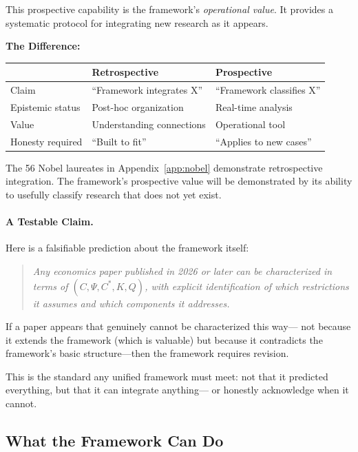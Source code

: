 This prospective capability is the framework's \emph{operational value}.
It provides a systematic protocol for integrating new research as it appears.

\textbf{The Difference:}
\begin{center}
\renewcommand{\arraystretch}{1.3}
\begin{tabular}{lll}
\hline
& \textbf{Retrospective} & \textbf{Prospective} \\
\hline
Claim & ``Framework integrates X'' & ``Framework classifies X'' \\
Epistemic status & Post-hoc organization & Real-time analysis \\
Value & Understanding connections & Operational tool \\
Honesty required & ``Built to fit'' & ``Applies to new cases'' \\
\hline
\end{tabular}
\end{center}

The 56 Nobel laureates in Appendix~\ref{app:nobel} demonstrate retrospective
integration. The framework's prospective value will be demonstrated by
its ability to usefully classify research that does not yet exist.

\paragraph{A Testable Claim.}
Here is a falsifiable prediction about the framework itself:

\begin{quote}
\emph{Any economics paper published in 2026 or later can be characterized
in terms of $(C, \Psi, C^*, K, Q)$, with explicit identification of
which restrictions it assumes and which components it addresses.}
\end{quote}

If a paper appears that genuinely cannot be characterized this way---
not because it extends the framework (which is valuable) but because
it contradicts the framework's basic structure---then the framework
requires revision.

This is the standard any unified framework must meet:
not that it predicted everything, but that it can integrate anything---
or honestly acknowledge when it cannot.

\subsection{What the Framework Can Do}

